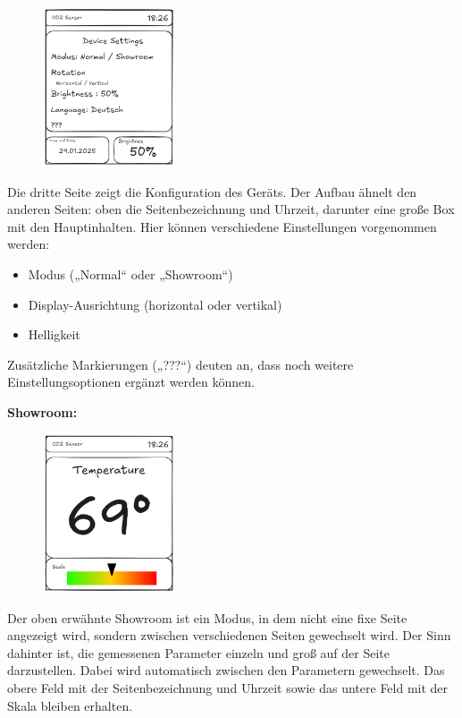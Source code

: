 \begin{inhalt}
\begin{figure}[!htb]
\centering
\includegraphics[width=0.35\textwidth]{files/Tobias/pics/Skizzen/Screen3_Settings.png}
\caption[Display Interface Skizze (Seite 3)]{}
\label{fig:display_skizze_seite_3}
\end{figure}

Die dritte Seite zeigt die Konfiguration des Geräts. Der Aufbau ähnelt den anderen Seiten: oben die Seitenbezeichnung und Uhrzeit, darunter eine große Box mit den Hauptinhalten. Hier können verschiedene Einstellungen vorgenommen werden:

\begin{itemize}
    \item Modus („Normal“ oder „Showroom“)
    \item Display-Ausrichtung (horizontal oder vertikal)
    \item Helligkeit
\end{itemize}

Zusätzliche Markierungen („???“) deuten an, dass noch weitere Einstellungsoptionen ergänzt werden können.

\begin{center}
    \textbf{Showroom:}
\end{center}

\begin{figure}[!htb]
\centering
\includegraphics[width=0.35\textwidth]{files/Tobias/pics/Skizzen/Showroom1.png}
\caption[Display Interface Skizze (Showroom)]{}
\label{fig:display_skizze_showroom1}
\end{figure}

Der oben erwähnte Showroom ist ein Modus, in dem nicht eine fixe Seite angezeigt wird, sondern zwischen verschiedenen Seiten gewechselt wird. Der Sinn dahinter ist, die gemessenen Parameter einzeln und groß auf der Seite darzustellen. Dabei wird automatisch zwischen den Parametern gewechselt. Das obere Feld mit der Seitenbezeichnung und Uhrzeit sowie das untere Feld mit der Skala bleiben erhalten.

\end{inhalt}